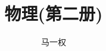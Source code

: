 \documentclass{book}
\title{物理(第二册)}
\author{马一权}
\begin{document}
    \maketitle


    \begin{yq_content}

    \end{yq_content}
\end{document}
